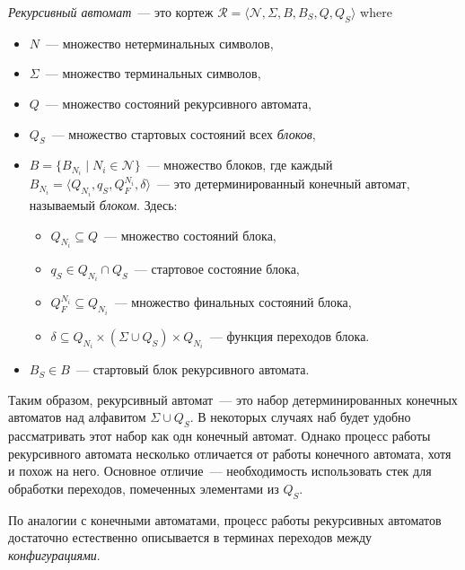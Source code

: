\begin{definition}
    \emph{Рекурсивный автомат}~--- это кортеж $\mathcal{R} = \langle \mathcal{N},\Sigma,B,B_S,Q,Q_S\rangle$ where
    \begin{itemize}
       \item $N$~--- множество нетерминальных символов, 
       \item $\Sigma$~--- множество терминальных символов, 
       \item $Q$~--- множество состояний рекурсивного автомата, 
       \item $Q_S$~--- множество стартовых состояний всех \emph{блоков}, 
       \item $B=\{B_{N_i} \mid N_i \in \mathcal{N}\}$~--- множество блоков, где каждый \\ $B_{N_i} = \langle Q_{N_i}, q_S, Q_F^{N_i}, \delta \rangle$~--- это детерминированный конечный автомат, называемый \emph{блоком}.
             Здесь:  
            \begin{itemize}
                \item $Q_{N_i} \subseteq Q$~--- множество состояний блока, 
                \item $q_S \in Q_{N_i} \cap Q_S$~--- стартовое состояние блока, 
                \item $Q_F^{N_i} \subseteq Q_{N_i}$~--- множество финальных состояний блока, 
                \item $\delta \subseteq Q_{N_i} \times  (\Sigma\cup Q_S) \times Q_{N_i}$~--- функция переходов блока.
            \end{itemize}
       \item $B_S \in B$~--- стартовый блок рекурсивного автомата.
    \end{itemize}
\end{definition}

Таким образом, рекурсивный автомат~--- это набор детерминированных конечных автоматов над алфавитом $\Sigma \cup Q_S$.
В некоторых случаях наб будет удобно рассматривать этот набор как одн конечный автомат.
Однако процесс работы рекурсивного автомата несколько отличается от работы конечного автомата, хотя и похож на него.
Основное отличие~--- необходимость использовать стек для обработки переходов, помеченных элементами из $Q_S$.

По аналогии с конечными автоматами, процесс работы рекурсивных автоматов достаточно естественно описывается в терминах переходов между \emph{конфигурациями}.


